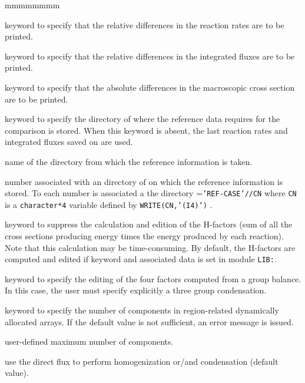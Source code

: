 \begin{ListeDeDescription}{mmmmmmmm}
\item[\moc{RATE}] keyword to specify that the relative differences in the
reaction rates are to be printed.

\item[\moc{FLUX}] keyword to specify that the relative differences in the
integrated fluxes are to be printed. 

\item[\moc{DELS}] keyword to specify that the absolute differences in the
macroscopic cross section are to be printed.

\item[\moc{REFE}] keyword to specify the directory of  where the
reference data requires for the comparison is stored. When this keyword is
absent, the last reaction rates and integrated fluxes saved on  are
used.

\item[\dusa{DIRO}] name of the directory from which the reference information
is taken.

\item[\dusa{idiro}] number associated with an directory of  on
which the reference information is  stored. To each number  is
associated a the directory  ={\tt 'REF-CASE'//CN} where {\tt CN} is a
{\tt character*4} variable defined by {\tt WRITE(CN,'(I4)')} . 

\item[\moc{NOHF}] keyword to suppress the calculation and edition of the H-factors (sum of all
the cross sections producing energy times the energy produced by each reaction).
Note that this calculation may be time-consuming. By default, the H-factors are
computed and edited if keyword  and associated data is set in module {\tt LIB:}.

\item[\moc{NBAL}] keyword to specify the editing of the four factors computed
from a group balance. In this case, the user must specify explicitly a three
group condensation.

\item[\moc{MAXR}] keyword to specify the number of components in
region-related dynamically allocated arrays. If the default value is
not sufficient, an error message is issued.

\item[\dusa{maxpts}] user-defined maximum number of components.

\item[\moc{DIRE}] use the direct flux to perform homogenization or/and
condensation (default value).


\end{ListeDeDescription}
